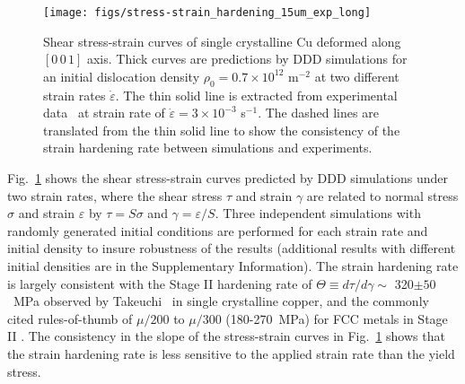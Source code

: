 \documentclass[%
reprint,
 amsmath,amssymb,
 aps,
superscriptaddress,
]{revtex4-1}
\begin{document}
\begin{figure}
\center
%
\texttt{[image: figs/stress-strain\_hardening\_15um\_exp\_long]} 
%
\caption{\label{fig:stressstrain} Shear stress-strain curves of single
crystalline Cu deformed along $[0\,0\,1]$ axis.
%
Thick curves are predictions by DDD simulations for an initial dislocation
density $\rho_0 = 0.7 \times 10^{12}$ m$^{-2}$ at two different strain rates
$\dot{\varepsilon}$.
%
%
%
The thin solid line is extracted from experimental data~\cite{Takeuchi1975} at
strain rate of $\dot{\varepsilon} = 3\times 10^{-3}$ s$^{-1}$.
%
The dashed lines are translated from the thin solid line to show the consistency
of the strain hardening rate between simulations and experiments.
%
%
%
%
%
}
\end{figure}

Fig.~\ref{fig:stressstrain} shows the shear stress-strain curves predicted by
DDD simulations under two strain rates, where the shear stress $\tau$ and strain
$\gamma$ are related to normal stress $\sigma$ and strain $\varepsilon$ by 
$\tau = S\sigma$ and $\gamma = \varepsilon/S$. 
%
Three independent simulations with randomly generated initial
conditions are performed for each strain rate and initial density to insure
robustness of the results ({additional results with different initial densities} are in
the Supplementary Information).
%
%
The strain hardening rate is largely consistent with the Stage II 
hardening rate of $\Theta \equiv d\tau/d\gamma \sim$ 320$\pm 50$~MPa observed by
Takeuchi~\cite{Takeuchi1975} in single crystalline copper, and the commonly
cited rules-of-thumb of $\mu/200$ to $\mu/300$ (180-270~MPa) for FCC metals in
Stage II \cite{Basinski1979,Kocks2003}.
%
The consistency in the slope of the stress-strain curves in
Fig.~\ref{fig:stressstrain} shows that the strain hardening rate is less
sensitive to the applied strain rate than the yield stress. 
%
\end{document}
